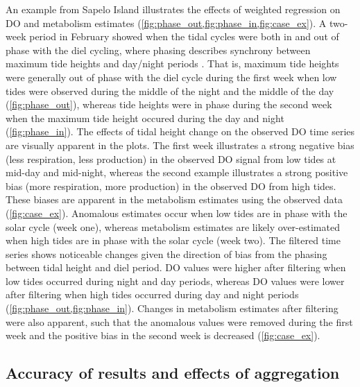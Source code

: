 \documentclass[letterpaper,12pt,oneside]{article}\usepackage[]{graphicx}\usepackage[]{color}
\begin{document}
An example from Sapelo Island illustrates the effects of weighted regression on \ac{DO} and metabolism estimates (\cref{fig:phase_out,fig:phase_in,fig:case_ex}).   A two-week period in February showed when the tidal cycles were both in and out of phase with the diel cycling, where phasing describes synchrony between maximum tide heights and day/night periods \citep{Nidzieko14}.  That is, maximum tide heights were generally out of phase with the diel cycle during the first week when low tides were observed during the middle of the night and the middle of the day (\cref{fig:phase_out}), whereas tide heights were in phase during the second week when the maximum tide height occured during the day and night (\cref{fig:phase_in}).  The effects of tidal height change on the observed \ac{DO} time series are visually apparent in the plots. The first week illustrates a strong negative bias (less respiration, less production) in the observed \ac{DO} signal from low tides at mid-day and mid-night, whereas the second example illustrates a strong positive bias (more respiration, more production) in the observed \ac{DO} from high tides. These biases are apparent in the metabolism estimates using the observed data (\cref{fig:case_ex}).  Anomalous estimates occur when low tides are in phase with the solar cycle (week one), whereas metabolism estimates are likely over-estimated when high tides are in phase with the solar cycle (week two).  The filtered time series shows noticeable changes given the direction of bias from the phasing between tidal height and diel period.  \ac{DO} values were higher after filtering when low tides occurred during night and day periods, whereas \ac{DO} values were lower after filtering when high tides occurred during day and night periods (\cref{fig:phase_out,fig:phase_in}).  Changes in metabolism estimates after filtering were also apparent, such that the anomalous values were removed during the first week and the positive bias in the second week is decreased (\cref{fig:case_ex}).

\subsection{Accuracy of results and effects of aggregation}
\end{document}
